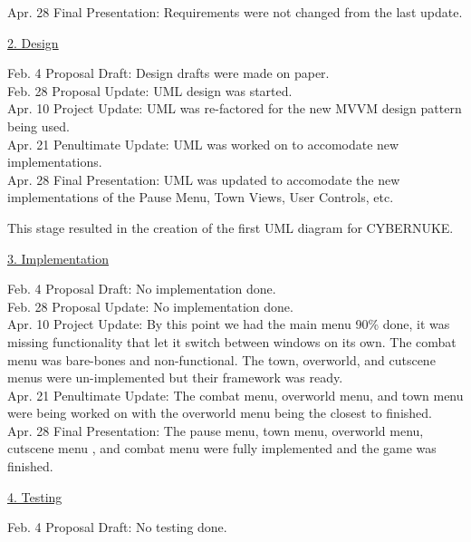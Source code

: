 \documentclass[10pt,conference,onecolumn,compsoc]{IEEEtran}
\begin{document}
Apr. 28 Final Presentation: 
Requirements were not changed from the last update.

\vspace{5px}
\underline{2. Design}
\vspace{5px}

Feb. 4 Proposal Draft: Design drafts were made on paper.\\

Feb. 28 Proposal Update: UML design was started.\\

Apr. 10 Project Update: UML was re-factored for the new MVVM design pattern being used.\\

Apr. 21 Penultimate Update: UML was worked on to accomodate new implementations.\\

Apr. 28 Final Presentation: UML was updated to accomodate the new implementations of the Pause Menu, Town Views, User Controls, etc.


This stage resulted in the creation of the first UML diagram for CYBERNUKE.

\vspace{5px}
\underline{3. Implementation}
\vspace{5px}

Feb. 4 Proposal Draft: No implementation done.\\

Feb. 28 Proposal Update: No implementation done.\\

Apr. 10 Project Update: By this point we had the main menu 90\% done, it was missing functionality that let it switch between windows on its own. The combat menu was bare-bones and non-functional. The town, overworld, and cutscene menus were un-implemented but their framework was ready.\\

Apr. 21 Penultimate Update: The combat menu, overworld menu, and town menu were being worked on with the overworld menu being the closest to finished.\\

Apr. 28 Final Presentation: The pause menu, town menu, overworld menu, cutscene menu , and combat menu were fully implemented and the game was finished.

\vspace{5px}
\underline{4. Testing}
\vspace{5px}

Feb. 4 Proposal Draft: No testing done.\\
\end{document}
